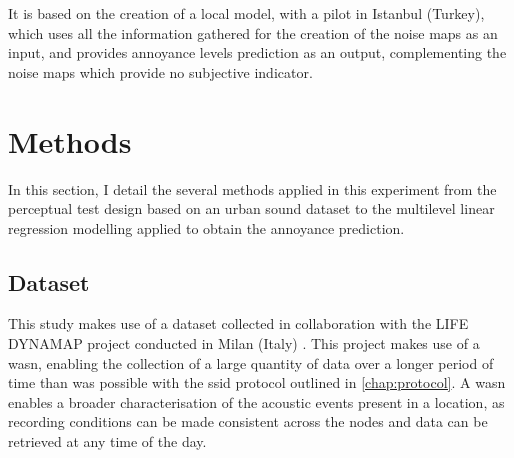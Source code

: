    It is based on the creation of a local model, with a pilot in Istanbul (Turkey), which uses all the information gathered for the creation of the noise maps as an input, and provides annoyance levels prediction as an output, complementing the noise maps which provide no subjective indicator.

\section{Methods}

 In this section, I detail the several methods applied in this experiment from the perceptual test design based on an urban sound dataset  to the multilevel linear regression modelling applied to obtain the annoyance prediction.

 \subsection{Dataset}
   This study makes use of a dataset collected in collaboration with the LIFE DYNAMAP project conducted in Milan (Italy) . This project makes use of a \gls{wasn}, enabling the collection of a large quantity of data over a longer period of time than was possible with the \gls{ssid} protocol outlined in \cref{chap:protocol}. 
A \gls{wasn} enables a broader characterisation of the acoustic events present in a location, as recording conditions can be made consistent across the nodes and data can be retrieved at any time of the day.
